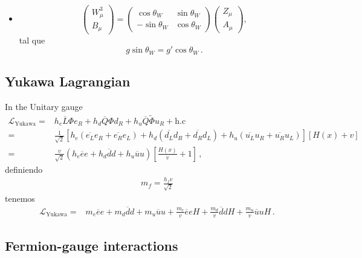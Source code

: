 \begin{frame}
\begin{itemize}
\item 
\begin{equation}
\label{eq:azmix}
  \begin{pmatrix}
    W^3_\mu\\
    B_\mu
  \end{pmatrix}=\begin{pmatrix}
    \cos\theta_W & \sin\theta_W\\
    -\sin\theta_W& \cos\theta_W
  \end{pmatrix}
  \begin{pmatrix}
    Z_\mu\\
    A_\mu
  \end{pmatrix},
\end{equation}
tal que
\begin{equation}
  \label{eq:tw}
  g\sin\theta_W=g'\cos\theta_W\,.
\end{equation}
\end{itemize} %

\end{frame}
\subsection{Yukawa Lagrangian}

\begin{frame}
In the Unitary gauge
\begin{align}
  \mathcal{L}_{\text{Yukawa}}=&h_e\overline{L}\Phi e_R+h_d\overline{Q}\Phi d_R+h_u\overline{Q}\widetilde{\Phi}u_R+\text{h.c}\nonumber\\
=&\frac{1}{\sqrt{2}}\left[h_e(\overline{e_L}e_R+\overline{e_R}e_L)+
h_d(\overline{d_L}d_R+\overline{d_R}d_L)
+h_u(\overline{u_L}u_R+\overline{u_R}u_L)\right]
\left[H(x)+v\right]\nonumber\\
=&\frac{v}{\sqrt{2}}\left(h_e\overline{e}e+h_d\overline{d}d
+h_u\overline{u}u\right)
\left[\frac{H(x)}{v}+1\right]\,,
\end{align}
definiendo
\begin{align}
  m_f=\frac{h_fv}{\sqrt{2}}
\end{align}
tenemos
\begin{align}
\label{eq:lyukfin}
 \mathcal{L}_{\text{Yukawa}}=&m_e\overline{e}e+m_d\overline{d}d
+m_u\overline{u}u+
  \frac{m_e}{v}\overline{e}e H+\frac{m_d}{v}\overline{d}d H
+\frac{m_u}{v}\overline{u}u H\,.
\end{align}

\end{frame}
\subsection{Fermion-gauge interactions}

